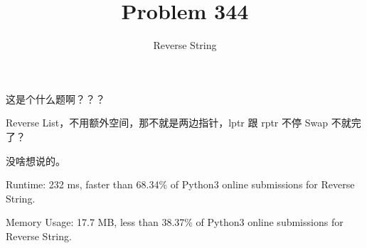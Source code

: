\documentclass[UTF8]{ctexart}
\title{Problem 344}
\author{Reverse String}
\begin{document}
这是个什么题啊？？？

Reverse List，不用额外空间，那不就是两边指针，lptr 跟 rptr 不停 Swap 不就完了？

没啥想说的。

Runtime: 232 ms, faster than 68.34\% of Python3 online submissions for Reverse String.

Memory Usage: 17.7 MB, less than 38.37\% of Python3 online submissions for Reverse String.
\end{document}

